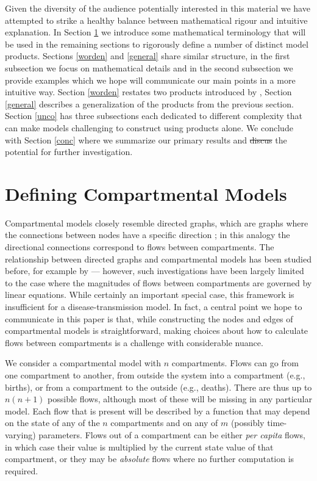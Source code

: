 \documentclass[pdflatex,sn-basic]{sn-jnl}%
\theoremstyle{definition}
\newcommand{\define}[1]{\emph{{#1}}}
\providecommand{\DIFadd}[1]{{\protect\color{blue}\uwave{#1}}} %
\providecommand{\DIFdel}[1]{{\protect\color{red}\sout{#1}}}                      %
\providecommand{\DIFaddbegin}{} %
\providecommand{\DIFaddend}{} %
\providecommand{\DIFdelbegin}{} %
\providecommand{\DIFdelend}{} %
\newcommand{\DIFscaledelfig}{0.5}
\newlength{\DIFdelgraphicswidth} %
\newlength{\DIFdelgraphicsheight} %
\newcommand{\DIFaddincludegraphics}[2][]{{\color{blue}\fbox{\DIFOincludegraphics[#1]{#2}}}} %
\newcommand{\DIFdelincludegraphics}[2][]{%
\sbox{\DIFdelgraphicsbox}{\DIFOincludegraphics[#1]{#2}}%
\settoboxwidth{\DIFdelgraphicswidth}{\DIFdelgraphicsbox} %
\settoboxtotalheight{\DIFdelgraphicsheight}{\DIFdelgraphicsbox} %
\scalebox{\DIFscaledelfig}{%
\parbox[b]{\DIFdelgraphicswidth}{\usebox{\DIFdelgraphicsbox}\\[-\baselineskip] \rule{\DIFdelgraphicswidth}{0em}}\llap{\resizebox{\DIFdelgraphicswidth}{\DIFdelgraphicsheight}{%
\setlength{\unitlength}{\DIFdelgraphicswidth}%
\begin{picture}(1,1)%
\thicklines\linethickness{2pt} %
{\color[rgb]{1,0,0}\put(0,0){\framebox(1,1){}}}%
{\color[rgb]{1,0,0}\put(0,0){\line( 1,1){1}}}%
{\color[rgb]{1,0,0}\put(0,1){\line(1,-1){1}}}%
\end{picture}%
}\hspace*{3pt}}} %
} %
\DeclareRobustCommand{\DIFaddbegin}{\DIFOaddbegin \let\includegraphics\DIFaddincludegraphics} %
\DeclareRobustCommand{\DIFaddend}{\DIFOaddend \let\includegraphics\DIFOincludegraphics} %
\DeclareRobustCommand{\DIFdelbegin}{\DIFOdelbegin \let\includegraphics\DIFdelincludegraphics} %
\DeclareRobustCommand{\DIFdelend}{\DIFOaddend \let\includegraphics\DIFOincludegraphics} %
\begin{document}
Given the diversity of the audience potentially interested in this material we have attempted to strike a healthy balance between mathematical rigour and intuitive explanation. In Section \ref{dcm} we introduce some mathematical terminology that will be used in the remaining sections to rigorously define a number of distinct model products. Sections \ref{worden} and \ref{general} share similar structure, in the first subsection we focus on mathematical details and in the second subsection we provide examples which we hope will communicate our main points in a more intuitive way. Section \ref{worden} restates two products introduced by \cite{worden2017products}, Section \ref{general} describes a generalization of the products from the previous section. Section \ref{unco} has three subsections each dedicated to different complexity that can make models challenging to construct using products alone. We conclude with Section \ref{conc} where we summarize our primary results and \DIFdelbegin \DIFdel{discus }\DIFdelend \DIFaddbegin \DIFadd{discuss }\DIFaddend the potential for further investigation.

\section{Defining Compartmental Models}\label{dcm}

Compartmental models closely resemble directed graphs, which are graphs where the connections between nodes have a specific direction \citep{roberts2009applied}; in this analogy the directional connections correspond to flows between compartments. The relationship between directed graphs and compartmental models has been studied before, for example by \cite{walter1999compartmental} --- however, such investigations have been largely limited to the case where the magnitudes of flows between compartments are governed by linear equations. While certainly an important special case, this framework is insufficient for a disease-transmission model. In fact, a central point we hope to communicate in this paper is that, while constructing the nodes and edges of compartmental models is straightforward, making choices about how to calculate flows between compartments is a challenge with considerable nuance.

We consider a compartmental model with $n$ compartments. Flows can go from one compartment to another, from outside the system into a compartment (e.g., births), or from a compartment to the outside (e.g., deaths). There are thus up to $n(n+1)$ possible flows, although most of these will be missing in any particular model. Each flow that is present will be described by a function that may depend on the state of any of the $n$ compartments and on any of $m$ (possibly time-varying) parameters. Flows out of a compartment can be either \define{per capita} flows, in which case their value is multiplied by the current state value of that compartment, or they may be \define{absolute} flows where no further computation is required.
\end{document}
